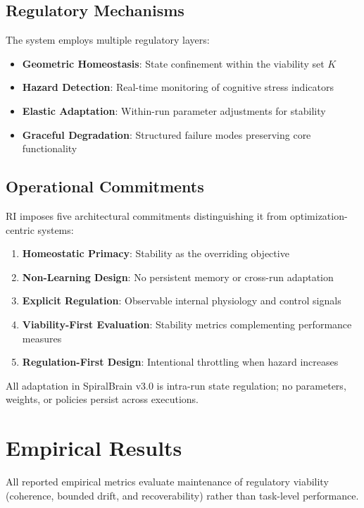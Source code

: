\documentclass[12pt,a4paper]{report}
\begin{document}
\subsection{Regulatory Mechanisms}

The system employs multiple regulatory layers:
\begin{itemize}
    \item \textbf{Geometric Homeostasis}: State confinement within the viability set $K$
    \item \textbf{Hazard Detection}: Real-time monitoring of cognitive stress indicators
    \item \textbf{Elastic Adaptation}: Within-run parameter adjustments for stability
    \item \textbf{Graceful Degradation}: Structured failure modes preserving core functionality
\end{itemize}

\subsection{Operational Commitments}

RI imposes five architectural commitments distinguishing it from optimization-centric systems:
\begin{enumerate}
    \item \textbf{Homeostatic Primacy}: Stability as the overriding objective
    \item \textbf{Non-Learning Design}: No persistent memory or cross-run adaptation
    \item \textbf{Explicit Regulation}: Observable internal physiology and control signals
    \item \textbf{Viability-First Evaluation}: Stability metrics complementing performance measures
    \item \textbf{Regulation-First Design}: Intentional throttling when hazard increases
\end{enumerate}

All adaptation in SpiralBrain v3.0 is intra-run state regulation; no parameters, weights, or policies persist across executions.

\section{Empirical Results}

All reported empirical metrics evaluate maintenance of regulatory viability (coherence, bounded drift, and recoverability) rather than task-level performance.
\end{document}
